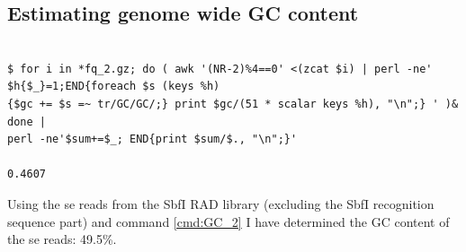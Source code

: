 \documentclass[a4paper,12pt,times,print,index,custombib,custommargin]{PhDThesisPSnPDF}\usepackage[]{graphicx}\usepackage[]{color}
\begin{document}
\FloatBarrier
\subsection{Estimating genome wide GC content}\label{ch:gc}

\begin{cmd}
\captionsetup{type=cmd} %
\begin{Verbatim}[formatcom=\color{darkgray}, fontsize=\scriptsize]

$ for i in *fq_2.gz; do ( awk '(NR-2)%4==0' <(zcat $i) | perl -ne' $h{$_}=1;END{foreach $s (keys %h)
{$gc += $s =~ tr/GC/GC/;} print $gc/(51 * scalar keys %h), "\n";} ' )& done | 
perl -ne'$sum+=$_; END{print $sum/$., "\n";}'

0.4607
\end{Verbatim}
\caption[Determine GC content from standard RAD PE reads]{\small For each individual, this command takes the \glspl{pe} reads, uniques them and determines their overall GC content. Finally, the average of the individual GC contents is taken. Note the brute-force parallelisation by sending each iteration of the \texttt{for} loop into the background with \texttt{(\ldots )\&}.}
\label{cmd:GC_1}
\end{cmd}

Using the \gls{se} reads from the \gls{SbfI} RAD library (excluding the SbfI recognition sequence part) and command \ref{cmd:GC_2} I have determined the GC content of the \gls{se} reads: 49.5\%.

\begin{cmd}
\captionsetup{type=cmd} %
\caption[Determine GC content of \gls{se} reads]{\small This command is a different version of command \ref{cmd:GC_1}. However, it is used here to determine the GC content of all \gls{se} reads from the standard \gls{SbfI} RAD library. It first creates and exports two functions, \texttt{gc} and \texttt{mean}, and then uses the programme \texttt{parallel} in order to parallelise the determination of GC content over 10 cores. After stripping barcode and the remainder of the restriction site, the reads are 40 base pairs long. Note, the space between \{ and \texttt{awk} (line 1) as well as \{ and \texttt{perl} (line 4) is required.}
\label{cmd:GC_2}
\end{cmd}
\end{document}
